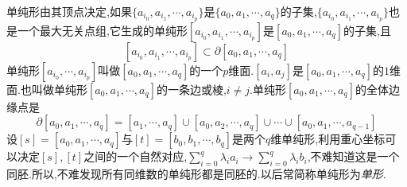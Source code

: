 \documentclass{article}
\begin{document}
单纯形由其顶点决定,如果$\{a_{i_0},a_{i_1},\cdots,a_{i_p}\}$是$\{a_0,a_1,\cdots,a_q\}$的子集,$\{a_{i_0},a_{i_1},\cdots,a_{i_p}\}$也是一个最大无关点组,它生成的单纯形$[a_{i_0},a_{i_1},\cdots,a_{i_p}]$是$[a_0,a_1,\cdots,a_q]$的子集,且
$$
[a_{i_0},a_{i_1},\cdots,a_{i_p}] \subset \partial[a_0,a_1,\cdots,a_q]
$$
单纯形$[a_{i_0},\cdots,a_{i_p}]$叫做$[a_0,a_1,\cdots,a_q]$的一个$p$维面.$[a_i,a_j]$是$[a_0,a_1,\cdots,a_q]$的$1$维面.也叫做单纯形$[a_0,a_1,\cdots,a_q]$的一条边或棱,$i \neq j$.单纯形$[a_0,a_1,\cdots,a_q]$的全体边缘点是
$$
\partial [a_0,a_1,\cdots,a_q] = [a_1,\cdots,a_q]\cup [a_0,a_2,\cdots,a_q]\cup \cdots \cup [a_0,a_1,\cdots,a_{q-1}]
$$
设$[s] = [a_0,a_1,\cdots,a_q]$与$[t] = [b_0,b_1,\cdots,b_q]$是两个$q$维单纯形,利用重心坐标可以决定$[s],[t]$之间的一个自然对应,$\sum_{i = 0}^q \lambda_i a_i \to \sum_{i = 0}^q \lambda_i b_i$,不难知道这是一个同胚.所以,不难发现所有同维数的单纯形都是同胚的.以后常简称单纯形为\emph{单形}.
\end{document}
